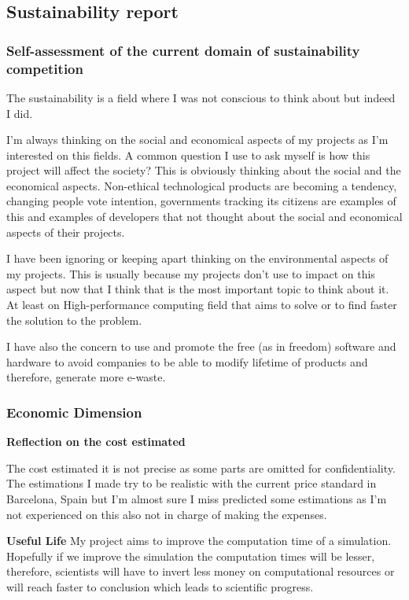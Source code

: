 \subsection{Sustainability report}

\subsubsection{Self-assessment of the current domain of sustainability competition}

The sustainability is a field where I was not conscious to think about but indeed I did.  

I'm always thinking on the social and economical aspects of my projects as I'm interested on this fields. A common question I use to ask myself is how this project will affect the society? This is obviously thinking about the social and the economical aspects. Non-ethical technological products are becoming a tendency, changing people vote intention, governments tracking its citizens are examples of this and examples of developers that not thought about the social and economical aspects of their projects.

I have been ignoring or keeping apart thinking on the environmental aspects of my projects. This is usually because my projects don't use to impact on this aspect but now that I think that is the most important topic to think about it. At least on High-performance computing field that aims to solve or to find faster the solution to the problem.

I have also the concern to use and promote the free (as in freedom) software and hardware to avoid companies to be able to modify lifetime of products and therefore, generate more e-waste.

\subsubsection{Economic Dimension}

\textbf{Reflection on the cost estimated}

The cost estimated it is not precise as some parts are omitted for confidentiality. The estimations I made try to be realistic with the current price standard in Barcelona, Spain but I'm almost sure I miss predicted some estimations as I'm not experienced on this also not in charge of making the expenses.

\textbf{Useful Life}
My project aims to improve the computation time of a simulation. Hopefully if we improve the simulation the computation times will be lesser, therefore, scientists will have to invert less money on computational resources or will reach faster to conclusion which leads to scientific progress. 

